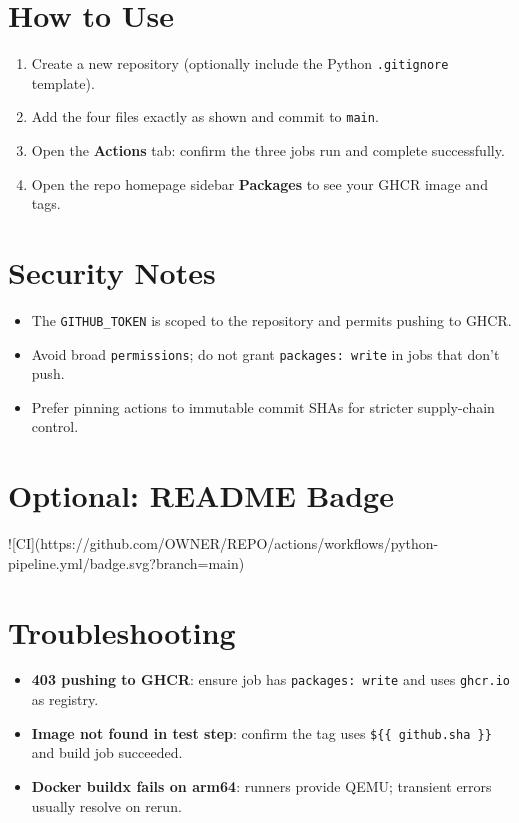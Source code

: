 \documentclass[11pt]{article}
\begin{document}
\section{How to Use}

\begin{enumerate}
  \item Create a new repository (optionally include the Python \texttt{.gitignore} template).
  \item Add the four files exactly as shown and commit to \texttt{main}.
  \item Open the \textbf{Actions} tab: confirm the three jobs run and complete successfully.
  \item Open the repo homepage sidebar \textbf{Packages} to see your GHCR image and tags.
\end{enumerate}

\section{Security Notes}

\begin{itemize}
  \item The \texttt{GITHUB\_TOKEN} is scoped to the repository and permits pushing to GHCR.
  \item Avoid broad \texttt{permissions}; do not grant \texttt{packages: write} in jobs that don't push.
  \item Prefer pinning actions to immutable commit SHAs for stricter supply-chain control.
\end{itemize}

\section{Optional: README Badge}

\begin{mdframed}[style=codebox]
\begin{mdcode}
![CI](https://github.com/OWNER/REPO/actions/workflows/python-pipeline.yml/badge.svg?branch=main)
\end{mdcode}
\end{mdframed}

\section{Troubleshooting}

\begin{itemize}
  \item \textbf{403 pushing to GHCR}: ensure job has \texttt{packages: write} and uses \texttt{ghcr.io} as registry.
  \item \textbf{Image not found in test step}: confirm the tag uses \texttt{\$\{\{ github.sha \}\}} and build job succeeded.
  \item \textbf{Docker buildx fails on arm64}: runners provide QEMU; transient errors usually resolve on rerun.
\end{itemize}
\end{document}

